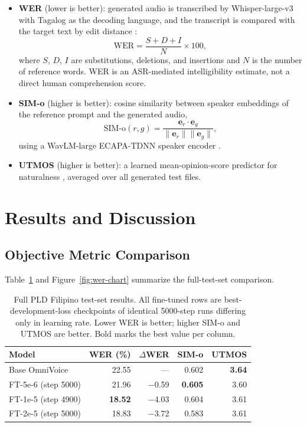 \documentclass[sigconf,nonacm]{acmart}
\begin{document}
\begin{itemize}
  \item \textbf{WER} (lower is better): generated audio is transcribed by Whisper-large-v3 \cite{whisper} with Tagalog as the decoding language, and the transcript is compared with the target text by edit distance \cite{levenshtein}:
  \begin{equation}
    \mathrm{WER} = \frac{S + D + I}{N} \times 100,
  \end{equation}
  where $S$, $D$, $I$ are substitutions, deletions, and insertions and $N$ is the number of reference words. WER is an ASR-mediated intelligibility estimate, not a direct human comprehension score.
  \item \textbf{SIM-o} (higher is better): cosine similarity between speaker embeddings of the reference prompt and the generated audio,
  \begin{equation}
    \mathrm{SIM\text{-}o}(r,g) =
    \frac{\mathbf{e}_r \cdot \mathbf{e}_g}
         {\lVert \mathbf{e}_r \rVert \lVert \mathbf{e}_g \rVert},
  \end{equation}
  using a WavLM-large ECAPA-TDNN speaker encoder \cite{wavlm,ecapatdnn}.
  \item \textbf{UTMOS} (higher is better): a learned mean-opinion-score predictor for naturalness \cite{utmos}, averaged over all generated test files.
\end{itemize}

\section{Results and Discussion}

\subsection{Objective Metric Comparison}

Table~\ref{tab:results-main} and Figure~\ref{fig:wer-chart} summarize the full-test-set comparison.

\begin{table}[t]
  \centering
  \caption{Full PLD Filipino test-set results. All fine-tuned rows are best-development-loss checkpoints of identical 5000-step runs differing only in learning rate. Lower WER is better; higher SIM-o and UTMOS are better. Bold marks the best value per column.}
  \label{tab:results-main}
  \small
  \setlength{\tabcolsep}{4pt}
  \begin{tabular}{lrrrr}
    \toprule
    Model & WER (\%) & $\Delta$WER & SIM-o & UTMOS \\
    \midrule
    Base OmniVoice & 22.55 & --- & 0.602 & \textbf{3.64} \\
    FT-5e-6 (step 5000) & 21.96 & $-$0.59 & \textbf{0.605} & 3.60 \\
    FT-1e-5 (step 4900) & \textbf{18.52} & $-$4.03 & 0.604 & 3.61 \\
    FT-2e-5 (step 5000) & 18.83 & $-$3.72 & 0.583 & 3.61 \\
    \bottomrule
  \end{tabular}
\end{table}
\end{document}
